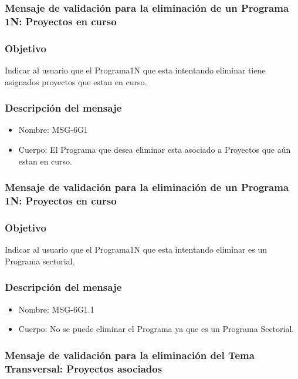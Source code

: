 \subsubsection{Mensaje de validación para la eliminación de un Programa 1N: Proyectos en curso} \label{MSG-6G1}
 
 \subsubsection{Objetivo}
 Indicar al usuario que el Programa1N que esta intentando eliminar tiene asignados proyectos que estan en curso.

 \subsubsection{Descripción del mensaje}
 \begin{itemize}
 \item Nombre: MSG-6G1
 \item Cuerpo: El Programa que desea eliminar esta asociado a Proyectos que aún estan en curso.
 \end{itemize}

\subsubsection{Mensaje de validación para la eliminación de un Programa 1N: Proyectos en curso} \label{MSG-6G1.1}
 
 \subsubsection{Objetivo}
 Indicar al usuario que el Programa1N que esta intentando eliminar es un Programa sectorial.

 \subsubsection{Descripción del mensaje}
 \begin{itemize}
 \item Nombre: MSG-6G1.1
 \item Cuerpo: No se puede eliminar el Programa ya que es un Programa Sectorial.
 \end{itemize}


\subsubsection{Mensaje de validación para la eliminación del Tema Transversal: Proyectos asociados} \label{MSG-6G2}
 
